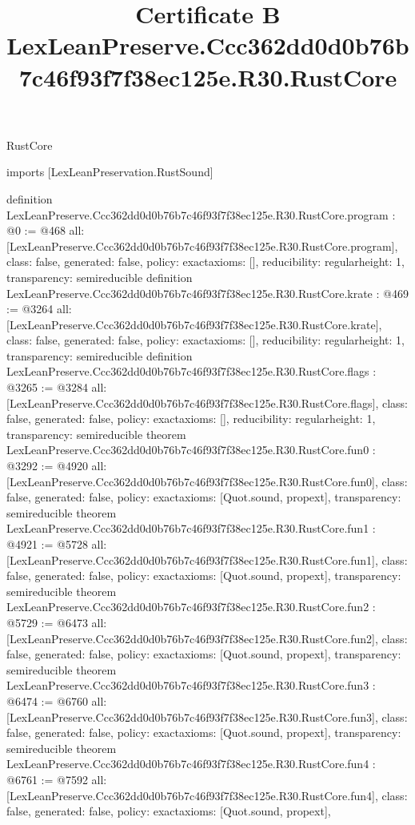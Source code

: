 \begin{lexlean}{RustCore}
\title{Certificate B LexLeanPreserve.Ccc362dd0d0b76b7c46f93f7f38ec125e.R30.RustCore}
\begin{coremodule}
imports [LexLeanPreservation.RustSound]

definition LexLeanPreserve.Ccc362dd0d0b76b7c46f93f7f38ec125e.R30.RustCore.program : @0 := @468 {
  all: [LexLeanPreserve.Ccc362dd0d0b76b7c46f93f7f38ec125e.R30.RustCore.program],
  class: false,
  generated: false,
  policy: exact{axioms: []},
  reducibility: regular{height: 1},
  transparency: semireducible
}
definition LexLeanPreserve.Ccc362dd0d0b76b7c46f93f7f38ec125e.R30.RustCore.krate : @469 := @3264 {
  all: [LexLeanPreserve.Ccc362dd0d0b76b7c46f93f7f38ec125e.R30.RustCore.krate],
  class: false,
  generated: false,
  policy: exact{axioms: []},
  reducibility: regular{height: 1},
  transparency: semireducible
}
definition LexLeanPreserve.Ccc362dd0d0b76b7c46f93f7f38ec125e.R30.RustCore.flags : @3265 := @3284 {
  all: [LexLeanPreserve.Ccc362dd0d0b76b7c46f93f7f38ec125e.R30.RustCore.flags],
  class: false,
  generated: false,
  policy: exact{axioms: []},
  reducibility: regular{height: 1},
  transparency: semireducible
}
theorem LexLeanPreserve.Ccc362dd0d0b76b7c46f93f7f38ec125e.R30.RustCore.fun0 : @3292 := @4920 {
  all: [LexLeanPreserve.Ccc362dd0d0b76b7c46f93f7f38ec125e.R30.RustCore.fun0],
  class: false,
  generated: false,
  policy: exact{axioms: [Quot.sound, propext]},
  transparency: semireducible
}
theorem LexLeanPreserve.Ccc362dd0d0b76b7c46f93f7f38ec125e.R30.RustCore.fun1 : @4921 := @5728 {
  all: [LexLeanPreserve.Ccc362dd0d0b76b7c46f93f7f38ec125e.R30.RustCore.fun1],
  class: false,
  generated: false,
  policy: exact{axioms: [Quot.sound, propext]},
  transparency: semireducible
}
theorem LexLeanPreserve.Ccc362dd0d0b76b7c46f93f7f38ec125e.R30.RustCore.fun2 : @5729 := @6473 {
  all: [LexLeanPreserve.Ccc362dd0d0b76b7c46f93f7f38ec125e.R30.RustCore.fun2],
  class: false,
  generated: false,
  policy: exact{axioms: [Quot.sound, propext]},
  transparency: semireducible
}
theorem LexLeanPreserve.Ccc362dd0d0b76b7c46f93f7f38ec125e.R30.RustCore.fun3 : @6474 := @6760 {
  all: [LexLeanPreserve.Ccc362dd0d0b76b7c46f93f7f38ec125e.R30.RustCore.fun3],
  class: false,
  generated: false,
  policy: exact{axioms: [Quot.sound, propext]},
  transparency: semireducible
}
theorem LexLeanPreserve.Ccc362dd0d0b76b7c46f93f7f38ec125e.R30.RustCore.fun4 : @6761 := @7592 {
  all: [LexLeanPreserve.Ccc362dd0d0b76b7c46f93f7f38ec125e.R30.RustCore.fun4],
  class: false,
  generated: false,
  policy: exact{axioms: [Quot.sound, propext]},
}
\end{coremodule}
\end{lexlean}
